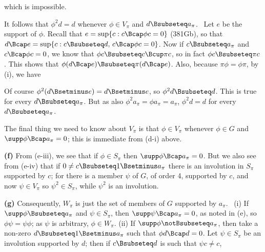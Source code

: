 {
     
\noindent which is impossible.\ \Bang\Qed
     
\medskip
     
 It follows that $\phi^2d=d$ whenever $\phi\in V_{\pi}$
and $d\Bsubseteq a_{\pi}$.   \Prf\ Let $e$ be the support of $\phi$.
Recall that $e=\sup\{c:c\Bcap\phi c=0\}$ (381Gb), so that
$d\Bcap e=\sup\{c:c\Bsubseteq d,\,c\Bcap\phi c=0\}$.   Now if
$c\Bsubseteq a_{\pi}$ and $c\Bcap\phi c=0$, we know that
$\phi c\Bsubseteq c\Bcup\pi c$, so in fact $\phi c\Bsubseteq\pi c$.
This shows that $\phi(d\Bcap e)\Bsubseteq\pi(d\Bcap e)$.   Also, because
$\pi\phi=\phi\pi$, by (i), we have
     
     
\noindent Of course $\phi^2(d\Bsetminus e)=d\Bsetminus e$, so
$\phi^2d\Bsubseteq d$.   This is true for every $d\Bsubseteq a_{\pi}$.
But as also $\phi^2a_{\pi}=\phi a_{\pi}=a_{\pi}$, $\phi^2d=d$ for every
$d\Bsubseteq a_{\pi}$.\ \Qed
     
\medskip
     
 The final thing we need to know about $V_{\pi}$ is that
$\phi\in V_{\pi}$ whenever $\phi\in G$ and $\supp\phi\Bcap a_{\pi}=0$;
this is immediate from (d-i) above.
     
\medskip
     
{\bf (f)} From (e-iii), we see that if $\phi\in S_{\pi}$ then
$\supp\phi\Bcap a_{\pi}=0$.   But we also see from (e-iv) that if $0\ne
c\Bsubseteq
1\Bsetminus a_{\pi}$ there is an involution in $S_{\pi}$ supported by
$c$;  for there is a member $\psi$ of $G$, of order 4, supported by $c$,
and now $\psi\in V_{\pi}$ so $\psi^2\in S_{\pi}$, while $\psi^2$ is an
involution.
     
\medskip
     
{\bf (g)} Consequently,
$W_{\pi}$ is just the set of members of $G$ supported by $a_{\pi}$.
\Prf\ (i) If $\supp\phi\Bsubseteq a_{\pi}$ and $\psi\in S_{\pi}$, then
$\supp\psi\Bcap a_{\pi}=0$, as noted in (e), so $\phi\psi=\psi\phi$;  as
$\psi$ is arbitrary, $\phi\in W_{\pi}$.   (ii) If
$\supp\phi\notBsubseteq a_{\pi}$, then take a non-zero $d\Bsubseteq
1\Bsetminus a_{\pi}$ such that $\phi d\Bcap d=0$.  Let $\psi\in S_{\pi}$
be an involution supported by $d$;  then if $c\Bsubseteq
d$ is such that $\psi c\ne c$,
     
     
}
